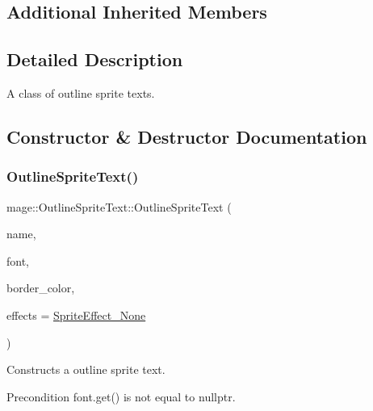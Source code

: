 \subsection*{Additional Inherited Members}


\subsection{Detailed Description}
A class of outline sprite texts. 

\subsection{Constructor \& Destructor Documentation}
\hypertarget{classmage_1_1_outline_sprite_text_ade104685e447589ada4c15a0a0159ced}{}\label{classmage_1_1_outline_sprite_text_ade104685e447589ada4c15a0a0159ced} 
\subsubsection{\texorpdfstring{Outline\+Sprite\+Text()}{OutlineSpriteText()}\hspace{0.1cm}{\footnotesize\ttfamily [1/4]}}
{\footnotesize\ttfamily mage\+::\+Outline\+Sprite\+Text\+::\+Outline\+Sprite\+Text (\begin{DoxyParamCaption}\item[{const string \&}]{name,  }\item[{\hyperlink{namespacemage_a1e01ae66713838a7a67d30e44c67703e}{Shared\+Ptr}$<$ \hyperlink{classmage_1_1_sprite_font}{Sprite\+Font} $>$}]{font,  }\item[{const \hyperlink{structmage_1_1_color}{Color} \&}]{border\+\_\+color,  }\item[{\hyperlink{namespacemage_a9cfe18123066ba4236f548f9de75d881}{Sprite\+Effect}}]{effects = {\ttfamily \hyperlink{namespacemage_a9cfe18123066ba4236f548f9de75d881af3c275fbfacfe174da928b2f24dfa515}{Sprite\+Effect\+\_\+\+None}} }\end{DoxyParamCaption})\hspace{0.3cm}{\ttfamily [explicit]}}

Constructs a outline sprite text.

\begin{DoxyPrecond}{Precondition}
{\ttfamily font.\+get()} is not equal to {\ttfamily nullptr}. 
\end{DoxyPrecond}

